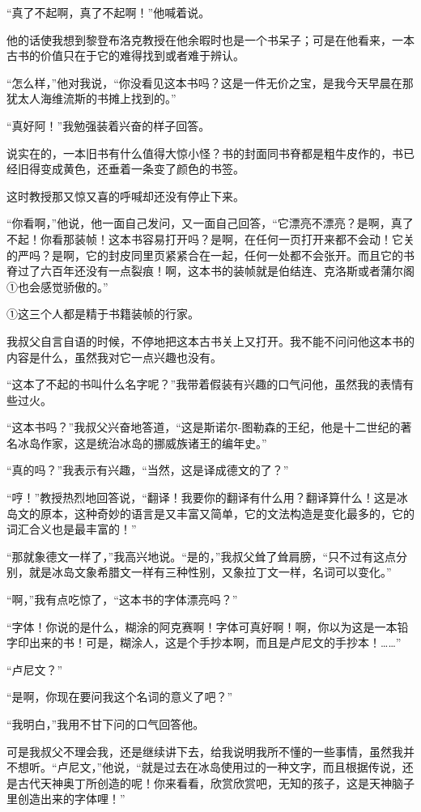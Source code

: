 \documentclass[10pt]{book}
\begin{document}
“真了不起啊，真了不起啊！”他喊着说。

他的话使我想到黎登布洛克教授在他余暇时也是一个书呆子；可是在他看来，一本古书的价值只在于它的难得找到或者难于辨认。

“怎么样，”他对我说，“你没看见这本书吗？这是一件无价之宝，是我今天早晨在那犹太人海维流斯的书摊上找到的。”

“真好阿！”我勉强装着兴奋的样子回答。

说实在的，一本旧书有什么值得大惊小怪？书的封面同书脊都是粗牛皮作的，书已经旧得变成黄色，还垂着一条变了颜色的书签。

这时教授那又惊又喜的呼喊却还没有停止下来。

“你看啊，”他说，他一面自己发问，又一面自己回答，“它漂亮不漂亮？是啊，真了不起！你看那装帧！这本书容易打开吗？是啊，在任何一页打开来都不会动！它关的严吗？是啊，它的封皮同里页紧紧合在一起，任何一处都不会张开。而且它的书脊过了六百年还没有一点裂痕！啊，这本书的装帧就是伯结连、克洛斯或者蒲尔阁①也会感觉骄傲的。”

①这三个人都是精于书籍装帧的行家。

我叔父自言自语的时候，不停地把这本古书关上又打开。我不能不问问他这本书的内容是什么，虽然我对它一点兴趣也没有。

“这本了不起的书叫什么名字呢？”我带着假装有兴趣的口气问他，虽然我的表情有些过火。

“这本书吗？”我叔父兴奋地答道，“这是斯诺尔-图勒森的王纪，他是十二世纪的著名冰岛作家，这是统治冰岛的挪威族诸王的编年史。”

“真的吗？”我表示有兴趣，“当然，这是译成德文的了？”

“哼！”教授热烈地回答说，“翻译！我要你的翻译有什么用？翻译算什么！这是冰岛文的原本，这种奇妙的语言是又丰富又简单，它的文法构造是变化最多的，它的词汇合义也是最丰富的！”

“那就象德文一样了，”我高兴地说。“是的，”我叔父耸了耸肩膀，“只不过有这点分别，就是冰岛文象希腊文一样有三种性别，又象拉丁文一样，名词可以变化。”

“啊，”我有点吃惊了，“这本书的字体漂亮吗？”

“字体！你说的是什么，糊涂的阿克赛啊！字体可真好啊！啊，你以为这是一本铅字印出来的书！可是，糊涂人，这是个手抄本啊，而且是卢尼文的手抄本！……”

“卢尼文？”

“是啊，你现在要问我这个名词的意义了吧？”

“我明白，”我用不甘下问的口气回答他。

可是我叔父不理会我，还是继续讲下去，给我说明我所不懂的一些事情，虽然我并不想听。“卢尼文，”他说，“就是过去在冰岛使用过的一种文字，而且根据传说，还是古代天神奥丁所创造的呢！你来看看，欣赏欣赏吧，无知的孩子，这是天神脑子里创造出来的字体哩！”
\end{document}
